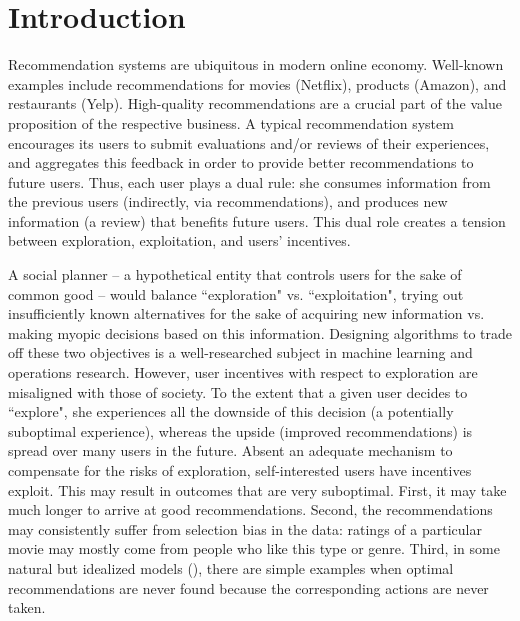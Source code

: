 \pagebreak
\section{Introduction}

Recommendation systems are ubiquitous in modern online economy. Well-known examples include recommendations for movies (\eg  Netflix), products (\eg  Amazon), and restaurants (\eg  Yelp).
High-quality recommendations are a crucial part of the value proposition of the respective business. 
%
A typical recommendation system encourages its users to submit evaluations and/or reviews of their experiences, and aggregates this feedback in order to provide better recommendations to future users. Thus, each user plays a dual rule: she consumes information from the previous users (indirectly, via recommendations),
and produces new information (\eg  a review) that benefits future users. This dual role creates a tension between exploration, exploitation, and users' incentives.

A social planner -- a hypothetical entity that controls users for the sake of common good -- would balance ``exploration" vs.  ``exploitation", \ie  trying out insufficiently known alternatives for the sake of acquiring new information vs. making myopic decisions based on this information. Designing algorithms to trade off these two objectives is a well-researched subject in machine learning and operations research. 
%
However, user incentives with respect to exploration are misaligned with those of society. To the extent that a given user decides to ``explore", she experiences all the downside of this decision (a potentially suboptimal experience), whereas the upside (improved recommendations) is spread over many users in the future. Absent an adequate mechanism to compensate for the risks of exploration, self-interested users have incentives exploit. This may result in outcomes that are very suboptimal. First, it may take much longer to arrive at good recommendations. Second, the recommendations may consistently suffer from selection bias in the data: \eg  ratings of a particular movie may mostly come from people who like this type or genre. Third, in some natural but idealized models (\eg  \cite{Kremer-JPE14,ICexploration-ec15}), there are simple  examples when optimal recommendations are never found because the corresponding actions are never taken.

